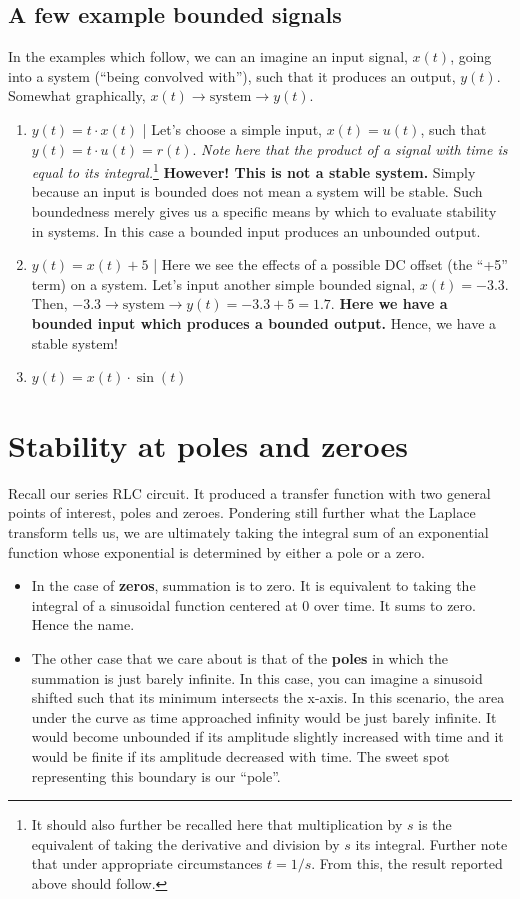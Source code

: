 \documentclass[11pt]{book}
\begin{document}
\subsection{A few example bounded signals}
In the examples which follow, we can an imagine an input signal, $x(t)$, going into a system (``being convolved with''), such that it produces an output, $y(t)$. Somewhat graphically, $x(t) \rightarrow \text{system} \rightarrow y(t)$.
\begin{enumerate}
	\item $y(t) = t\cdot x(t)$ | Let's choose a simple input, $x(t) = u(t)$, such that $y(t) = t\cdot u(t) = r(t)$. \textit{Note here that the product of a signal with time is equal to its integral.}\footnote{It should also further be recalled here that multiplication by $s$ is the equivalent of taking the derivative and division by $s$ its integral. Further note that under appropriate circumstances $t = 1/s$. From this, the result reported above should follow.}
	\subitem \textbf{However! This is not a stable system.} Simply because an input is bounded does not mean a system will be stable. Such boundedness merely gives us a specific means by which to evaluate stability in systems. In this case a bounded input produces an unbounded output.
	\item $y(t) = x(t) + 5$ | Here we see the effects of a possible DC offset (the ``+5'' term) on a system. Let's input another simple bounded signal, $x(t) = -3.3$. Then, $-3.3 \rightarrow \text{system} \rightarrow y(t) = -3.3 + 5 = 1.7$. 
	\subitem \textbf{Here we have a bounded input which produces a bounded output.} Hence, we have a stable system!
	\item $y(t) = x(t)\cdot\sin(t)$
\end{enumerate}

\section{Stability at poles and zeroes}
Recall our series RLC circuit. It produced a transfer function with two general points of interest, poles and zeroes. Pondering still further what the Laplace transform tells us, we are ultimately taking the integral sum of an exponential function whose exponential is determined by either a pole or a zero. 

\begin{itemize}
	\item In the case of \textbf{zeros}, summation is to zero. It is equivalent to taking the integral of a sinusoidal function centered at 0 over time. It sums to zero. Hence the name.
	\item The other case that we care about is that of the \textbf{poles} in which the summation is just barely infinite. In this case, you can imagine a sinusoid shifted such that its minimum intersects the x-axis. In this scenario, the area under the curve as time approached infinity would be just barely infinite.
	\subitem It would become unbounded if its amplitude slightly increased with time and it would be finite if its amplitude decreased with time. The sweet spot representing this boundary is our ``pole''.
\end{itemize}
\end{document}
